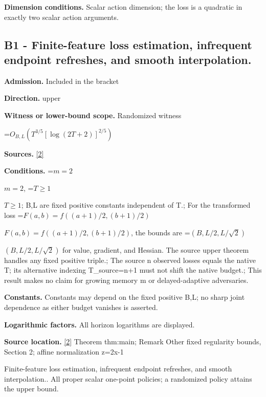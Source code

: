 \documentclass[10pt,a4paper]{article}
\newcommand{\AtlasMath}[1]{\par\begingroup\centering\setbox0=\hbox{$\displaystyle #1$}\ifdim\wd0>1.4\linewidth\typeout{ATLAS WIDE FORMULA: \the\wd0}\fi\ifdim\wd0>\linewidth\resizebox{\linewidth}{!}{\box0}\else\box0\fi\par\endgroup}
\newcommand{\AtlasInlineMath}[1]{\begingroup\setbox0=\hbox{$#1$}\ifdim\wd0>.4\linewidth\endgroup\AtlasMath{#1}\else\endgroup$#1$\fi}
\begin{document}
\textbf{Dimension conditions.} Scalar action dimension; the loss is a quadratic in exactly two scalar action arguments.



\subsection{B1 - Finite-feature loss estimation, infrequent endpoint refreshes, and smooth interpolation.}


\textbf{Admission.} Included in the bracket



\textbf{Direction.} upper



\textbf{Witness or lower-bound scope.} Randomized witness



\AtlasMath{O_{B,L}\!\left(T^{3/5}[\log(2T+2)]^{2/5}\right)}


\textbf{Sources.} \href{https://github.com/WU-Wendao/Colombo/blob/main/colombo_sensorium/Complexity_altas/data/sources/colombo/Q5/manuscript.pdf}{[2]}



\textbf{Conditions.} \AtlasInlineMath{m=2}, \AtlasInlineMath{T\ge1}; B,L are fixed positive constants independent of T.; For the transformed loss \AtlasInlineMath{F(a,b)=f((a+1)/2,(b+1)/2)}, the bounds are \AtlasInlineMath{(B,L/2,L/\sqrt2)} for value, gradient, and Hessian. The source upper theorem handles any fixed positive triple.; The source n observed losses equals the native T; its alternative indexing T\_source=n+1 must not shift the native budget.; This result makes no claim for growing memory m or delayed-adaptive adversaries.



\textbf{Constants.} Constants may depend on the fixed positive B,L; no sharp joint dependence as either budget vanishes is asserted.



\textbf{Logarithmic factors.} All horizon logarithms are displayed.



\textbf{Source location.} \href{https://github.com/WU-Wendao/Colombo/blob/main/colombo_sensorium/Complexity_altas/data/sources/colombo/Q5/manuscript.pdf}{[2]} Theorem thm:main; Remark Other fixed regularity bounds, Section 2; affine normalization z=2x-1



Finite-feature loss estimation, infrequent endpoint refreshes, and smooth interpolation.. All proper scalar one-point policies; a randomized policy attains the upper bound.
\end{document}
